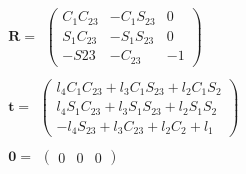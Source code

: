 \documentclass[10pt]{jarticle}
\begin{document}
	\begin{equation*}
	\begin{split}
		&\boldsymbol{R} = 
		\begin{array}{cc}
			\left( 
				\begin{array}{ccc}
					C_1C_{23} & -C_1S_{23} & 0 \\
					S_1C_{23} & -S_1S_{23} & 0 \\
					-S{23} & -C_{23} & -1 
				\end{array}
			\right)
		\end{array} \\
		&\boldsymbol{t} = 
		\begin{array}{cc}
			\left( 
				\begin{array}{c}
					l_4C_1C_{23}+l_3C_1S_{23}+l_2C_1S_2 \\
					l_4S_1C_{23}+l_3S_1S_{23}+l_2S_1S_2 \\
				-l_4S_{23}+l_3C_{23}+l_2C_2+l_1 
				\end{array}
			\right)
		\end{array}\\
		&\boldsymbol{0} = 
		\begin{array}{cc}
			\left( 
				\begin{array}{ccc}
					0 & 0 & 0
				\end{array}
			\right)
		\end{array}
	\end{split}
	\end{equation*}
\end{document}
